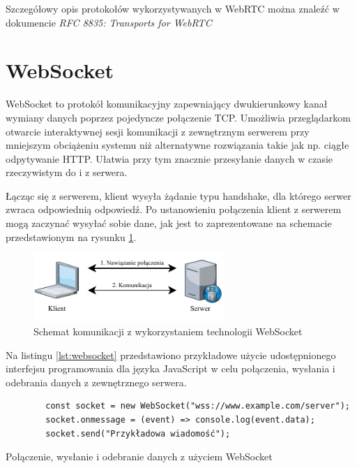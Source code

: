 \documentclass[language=polish,type=master]{aghmodern}
\begin{document}
Szczegółowy opis protokołów wykorzystywanych w WebRTC można znaleźć w dokumencie \emph{RFC 8835: Transports for WebRTC} \cite{RFC8835}

\pagebreak

\section{WebSocket}
WebSocket to protokół komunikacyjny zapewniający dwukierunkowy kanał wymiany danych poprzez pojedyncze połączenie TCP.
Umożliwia przeglądarkom otwarcie interaktywnej sesji komunikacji z zewnętrznym serwerem przy mniejszym obciążeniu systemu niż alternatywne rozwiązania takie jak np. ciągłe odpytywanie HTTP.
Ułatwia przy tym znacznie przesyłanie danych w czasie rzeczywistym do i z serwera.

Łącząc się z serwerem, klient wysyła żądanie typu handshake\footnotemark{}, dla którego serwer zwraca odpowiednią odpowiedź.
Po ustanowieniu połączenia klient z serwerem mogą zaczynać wysyłać sobie dane, jak jest to zaprezentowane na schemacie przedstawionym na rysunku \ref{fig:websocket}.

\begin{figure}[H]
    \centering
    \vspace*{15pt}
    \includegraphics[width=0.6435\textwidth]{images/websocket.pdf}
    \caption{Schemat komunikacji z wykorzystaniem technologii WebSocket}
    \label{fig:websocket}
\end{figure}

Na listingu \ref{lst:websocket} przedstawiono przykładowe użycie udostępnionego interfejsu programowania dla języka JavaScript w celu połączenia, wysłania i odebrania danych z zewnętrznego serwera.

\begin{listing}[H]
    \begin{verbatim}
        const socket = new WebSocket("wss://www.example.com/server");
        socket.onmessage = (event) => console.log(event.data);
        socket.send("Przykładowa wiadomość");
    \end{verbatim}
    \caption{Połączenie, wysłanie i odebranie danych z użyciem WebSocket}
    \label{lst:websocket}
\end{listing}
\end{document}
